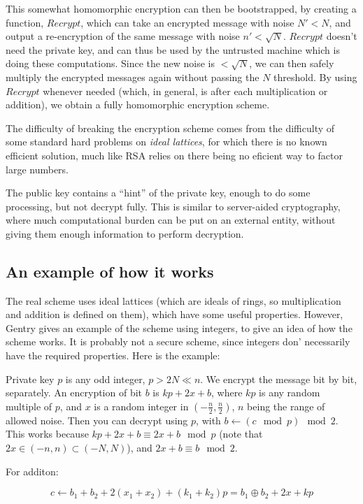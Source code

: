 \documentclass{article}
\begin{document}
This somewhat homomorphic encryption can then be bootstrapped, by creating a function, $Recrypt$, which can take an encrypted message with noise $N' < N$, and output a re-encryption of the same message with noise $n' < \sqrt{N}$. $Recrypt$ doesn't need the private key, and can thus be used by the untrusted machine which is doing these computations. Since the new noise is $< \sqrt{N}$, we can then safely multiply the encrypted messages again without passing the $N$ threshold. By using $Recrypt$ whenever needed (which, in general, is after each multiplication or addition), we obtain a fully homomorphic encryption scheme.

The difficulty of breaking the encryption scheme comes from the difficulty of some standard hard problems on \textit{ideal lattices}, for which there is no known efficient solution, much like RSA relies on there being no eficient way to factor large numbers.

The public key contains a ``hint'' of the private key, enough to do some processing, but not decrypt fully. This is similar to server-aided cryptography, where much computational burden can be put on an external entity, without giving them enough information to perform decryption.

\subsection{An example of how it works}

The real scheme uses ideal lattices (which are ideals of rings, so multiplication and addition is defined on them), which have some useful properties. However, Gentry gives an example of the scheme using integers, to give an idea of how the scheme works. It is probably not a secure scheme, since integers don' necessarily have the required properties. Here is the example:

Private key $p$ is any odd integer, $p > 2N \ll n$. We encrypt the message bit by bit, separately. An encryption of bit $b$ is $kp + 2x + b$, where $kp$ is any random multiple of $p$, and $x$ is a random integer in $(-\frac{n}{2}, \frac{n}{2})$, $n$ being the range of allowed noise. Then you can decrypt using $p$, with $b \leftarrow (c \mod p) \mod 2$. This works because $kp + 2x + b \equiv 2x + b \mod p$ (note that $2x \in (-n, n) \subset (-N, N)$), and $2x + b \equiv b \mod 2$.

For additon:

$$c \leftarrow b_1 + b_2 + 2(x_1 + x_2) + (k_1 + k_2)p = b_1 \oplus b_2 + 2x + kp$$
\end{document}
